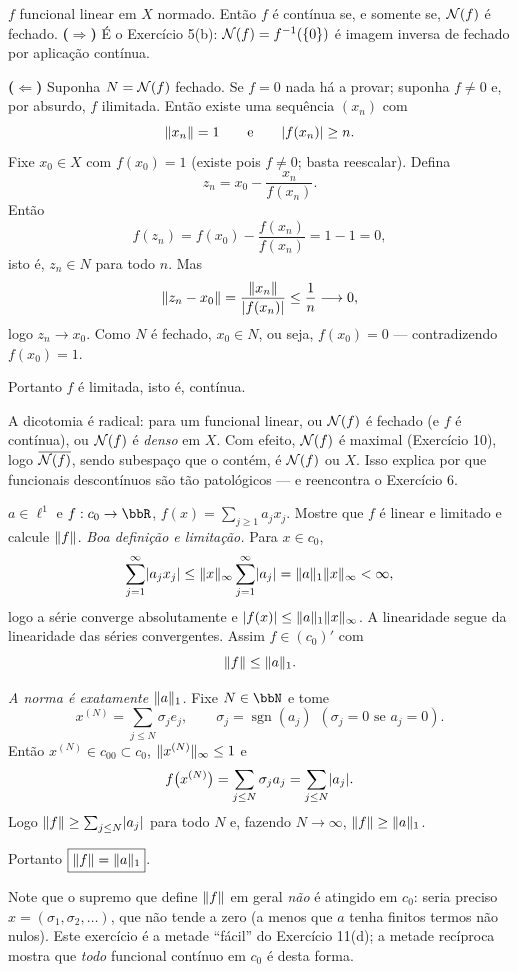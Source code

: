 \begin{exercicio}{$f$ funcional linear em $X$ normado. Então $f$ é contínua se, e somente se, $\mathcal{N}(f)$ é fechado.}
\sol
\textbf{($\Rightarrow$)} É o Exercício 5(b): $\mathcal{N}(f)=f^{-1}(\{0\})$ é imagem inversa de fechado por aplicação contínua.

\textbf{($\Leftarrow$)} Suponha $N=\mathcal{N}(f)$ fechado. Se $f=0$ nada há a provar; suponha $f\neq0$ e, por absurdo, $f$ ilimitada. Então existe uma sequência $(x_n)$ com
\[ \lVert x_n\rVert=1 \qquad\text{e}\qquad \lvert f(x_n)\rvert\ge n. \]
Fixe $x_0\in X$ com $f(x_0)=1$ (existe pois $f\neq0$; basta reescalar). Defina
\[ z_n=x_0-\frac{x_n}{f(x_n)} . \]
Então
\[ f(z_n)=f(x_0)-\frac{f(x_n)}{f(x_n)}=1-1=0, \]
isto é, $z_n\in N$ para todo $n$. Mas
\[ \lVert z_n-x_0\rVert=\frac{\lVert x_n\rVert}{\lvert f(x_n)\rvert}\le\frac1n\longrightarrow0, \]
logo $z_n\to x_0$. Como $N$ é fechado, $x_0\in N$, ou seja, $f(x_0)=0$ --- contradizendo $f(x_0)=1$.

Portanto $f$ é limitada, isto é, contínua.

\begin{obs}
A dicotomia é radical: para um funcional linear, ou $\mathcal{N}(f)$ é fechado (e $f$ é contínua), ou $\mathcal{N}(f)$ é \emph{denso} em $X$. Com efeito, $\mathcal{N}(f)$ é maximal (Exercício 10), logo $\overline{\mathcal{N}(f)}$, sendo subespaço que o contém, é $\mathcal{N}(f)$ ou $X$. Isso explica por que funcionais descontínuos são tão patológicos --- e reencontra o Exercício 6.
\end{obs}
\end{exercicio}

\begin{exercicio}{$a\in \ell^1$ e $f:c_0\to\R$, $f(x)=\sum_{j\ge1}a_jx_j$. Mostre que $f$ é linear e limitado e calcule $\lVert f\rVert$.}
\sol
\emph{Boa definição e limitação.} Para $x\in c_0$,
\[ \sum_{j=1}^{\infty}\lvert a_jx_j\rvert\le\lVert x\rVert_\infty\sum_{j=1}^{\infty}\lvert a_j\rvert=\lVert a\rVert_1\lVert x\rVert_\infty<\infty, \]
logo a série converge absolutamente e $\lvert f(x)\rvert\le\lVert a\rVert_1\lVert x\rVert_\infty$. A linearidade segue da linearidade das séries convergentes. Assim $f\in(c_0)'$ com
\[ \lVert f\rVert\le\lVert a\rVert_1. \]

\emph{A norma é exatamente $\lVert a\rVert_1$.} Fixe $N\in\N$ e tome
\[ x^{(N)}=\sum_{j\le N}\sigma_je_j,\qquad \sigma_j=\operatorname{sgn}(a_j)\ \ (\sigma_j=0 \text{ se } a_j=0). \]
Então $x^{(N)}\in c_{00}\subset c_0$, $\lVert x^{(N)}\rVert_\infty\le1$ e
\[ f\bigl(x^{(N)}\bigr)=\sum_{j\le N}\sigma_ja_j=\sum_{j\le N}\lvert a_j\rvert. \]
Logo $\lVert f\rVert\ge\sum_{j\le N}\lvert a_j\rvert$ para todo $N$ e, fazendo $N\to\infty$, $\lVert f\rVert\ge\lVert a\rVert_1$.

Portanto $\boxed{\lVert f\rVert=\lVert a\rVert_1}$.

\begin{obs}
Note que o supremo que define $\lVert f\rVert$ em geral \emph{não} é atingido em $c_0$: seria preciso $x=(\sigma_1,\sigma_2,\dots)$, que não tende a zero (a menos que $a$ tenha finitos termos não nulos). Este exercício é a metade ``fácil'' do Exercício 11(d); a metade recíproca mostra que \emph{todo} funcional contínuo em $c_0$ é desta forma.
\end{obs}
\end{exercicio}

